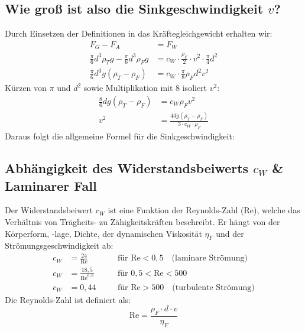\documentclass[a4paper,11pt]{article}
\begin{document}
\subsection*{Wie groß ist also die Sinkgeschwindigkeit $v$?}
Durch Einsetzen der Definitionen in das Kräftegleichgewicht erhalten wir:
\begin{align*}
    F_G - F_A &= F_W \\
    \frac{\pi}{6} d^3 \rho_T g - \frac{\pi}{6} d^3 \rho_F g &= c_W \cdot \frac{\rho_F}{2} \cdot v^2 \cdot \frac{\pi}{4} d^2 \\
    \frac{\pi}{6} d^3 g (\rho_T - \rho_F) &= c_W \cdot \frac{\pi}{8} \rho_F d^2 v^2
\end{align*}
Kürzen von $\pi$ und $d^2$ sowie Multiplikation mit 8 isoliert $v^2$:
\begin{align*}
    \frac{8}{6} d g (\rho_T - \rho_F) &= c_W \rho_F v^2 \\
    v^2 &= \frac{4 d g (\rho_T - \rho_F)}{3 \cdot c_W \cdot \rho_F}
\end{align*}
Daraus folgt die allgemeine Formel für die Sinkgeschwindigkeit:
\pagebreak
\subsection*{Abhängigkeit des Widerstandsbeiwerts $c_W$ \& Laminarer Fall}
Der Widerstandsbeiwert $c_W$ ist eine Funktion der Reynolds-Zahl ($\text{Re}$), welche das Verhältnis von Trägheits- zu Zähigkeitskräften beschreibt. Er hängt von der Körperform, -lage, Dichte, der dynamischen Viskosität $\eta_F$ und der Strömungsgeschwindigkeit ab:
\begin{align*}
    c_W &= \frac{24}{\text{Re}} \quad &&\text{für } \text{Re} < 0{,}5 \quad \text{(laminare Strömung)} \\
    c_W &= \frac{18{,}5}{\text{Re}^{0{,}6}} \quad &&\text{für } 0{,}5 < \text{Re} < 500 \\
    c_W &= 0{,}44 \quad &&\text{für } \text{Re} > 500 \quad \text{(turbulente Strömung)}
\end{align*}
\ppbig
Die Reynolds-Zahl ist definiert als:
\begin{equation}
    \text{Re} = \frac{\rho_F \cdot d \cdot v}{\eta_F}
\end{equation}
\end{document}
